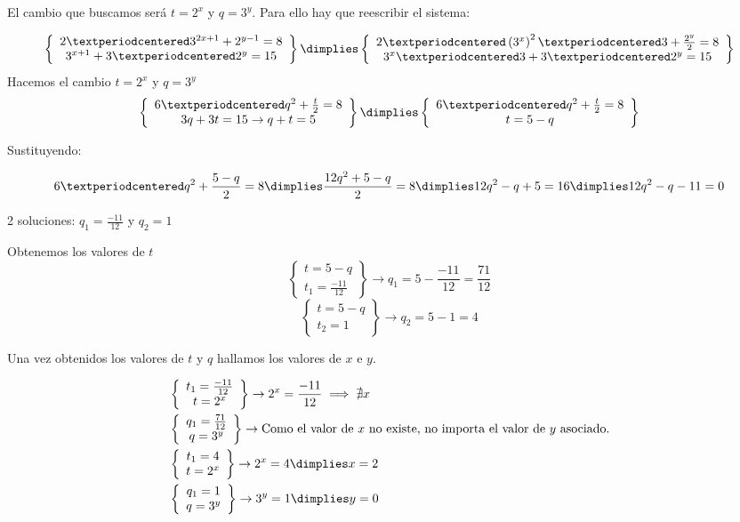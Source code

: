 \documentclass[palatino,nosec]{Docencia}
\begin{document}
\begin{problem}
\spart 
El cambio que buscamos será $t=2^x$ y $q=3^y$. Para ello hay que reescribir el sistema:

\[
	\left\{
		\begin{array}{c}
			2·3^{2x+1}+2^{y-1} = 8\\
			3^{x+1}+3·2^y = 15
		\end{array}	
	\right\}\dimplies
	\left\{
		\begin{array}{c}
			2·\left(3^{x}\right)^2·3+\frac{2^{y}}{2} = 8\\
			3^{x}·3+3·2^y = 15
		\end{array}	
	\right\}
\]
Hacemos el cambio $t=2^x$ y $q=3^y$
\[
	\left\{
		\begin{array}{c}
			6·q^2+\frac{t}{2} = 8\\
			3q+3t = 15 \to q+t=5
		\end{array}	
	\right\}\dimplies
	\left\{
		\begin{array}{c}
			6·q^2+\frac{t}{2} = 8\\
			t=5-q
		\end{array}	
	\right\}
\]

Sustituyendo: 

\[
	6·q^2+\frac{5-q}{2} = 8 \dimplies \frac{12q^2 +5-q}{2} = 8 \dimplies 12q^2 - q +5=16 \dimplies 12q^2-q-11=0
\]

2 soluciones: $q_1 = \frac{-11}{12}$ y $q_2 = 1$

Obtenemos los valores de $t$
\[
	\left\{
		\begin{array}{c}
			t=5-q\\
			t_1=\frac{-11}{12}
		\end{array}	
	\right\}\to q_1=5-\frac{-11}{12} = \frac{71}{12}
\]\[
	\left\{
		\begin{array}{c}
			t=5-q\\
			t_2=1
		\end{array}	
	\right\}\to q_2= 5-1=4
\]

Una vez obtenidos los valores de $t$ y $q$ hallamos los valores de $x$ e $y$.

\begin{align*}
	&\left\{
		\begin{array}{c}
			t_1=\frac{-11}{12}\\
			t=2^x
		\end{array}	
	\right\}\to 2^x=\frac{-11}{12} \implies \nexists x
\\
	&\left\{
		\begin{array}{c}
			q_1=\frac{71}{12}\\
			q=3^y
		\end{array}	
	\right\}\to \text{Como el valor de $x$ no existe, no importa el valor de $y$ asociado.}
\\
	&\left\{
		\begin{array}{c}
			t_1=4\\
			t=2^x
		\end{array}	
	\right\}\to 2^x=4 \dimplies x=2
\\
	&\left\{
		\begin{array}{c}
			q_1=1\\
			q=3^y
		\end{array}	
	\right\}\to 3^y=1 \dimplies y=0
\end{align*}


\end{problem}
\end{document}
